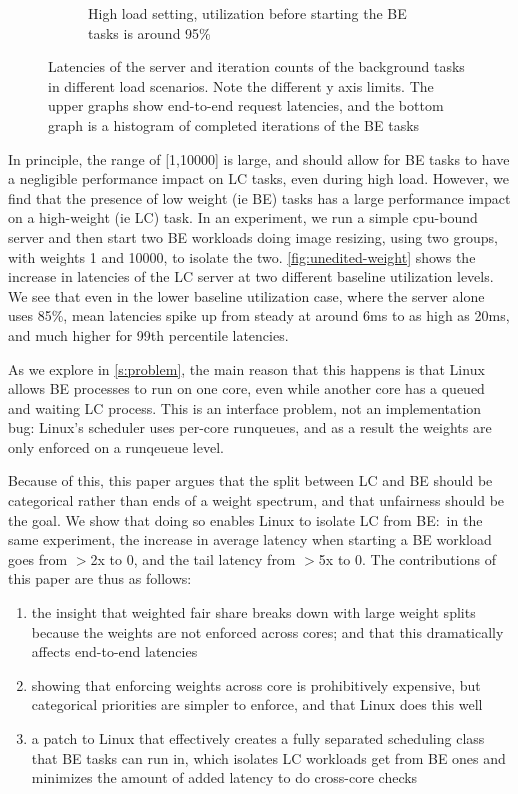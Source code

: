 \begin{figure}[t]
\begin{subfigure}[b]{0.49\columnwidth}
        \caption{High load setting, utilization before starting the BE tasks is
        around 95\%}\label{fig:unedited-weight-high-two}
    \end{subfigure}
    \vspace{4pt}
    \caption{Latencies of the server and iteration counts of the background
    tasks in different load scenarios. Note the different y axis limits. The
    upper graphs show end-to-end request latencies, and the bottom graph is a
    histogram of completed iterations of the BE tasks}\label{fig:unedited-weight}
\end{figure}

In principle, the range of [1,10000] is large, and should allow for BE tasks to
have a negligible performance impact on LC tasks, even during high load.
However, we find that the presence of low weight (ie BE) tasks has a large
performance impact on a high-weight (ie LC) task. In an experiment, we run a
simple cpu-bound server and then start two BE workloads doing image resizing,
using two \cgroups{} groups, with weights 1 and 10000, to isolate the two.
\autoref{fig:unedited-weight} shows the increase in latencies of the LC server
at two different baseline utilization levels. We see that even in the lower
baseline utilization case, where the server alone uses 85\%, mean latencies
spike up from steady at around 6ms to as high as 20ms, and much higher for 99th
percentile latencies.

As we explore in \autoref{s:problem}, the main reason that this happens is that
Linux allows BE processes to run on one core, even while another core has a
queued and waiting LC process. This is an interface problem, not an
implementation bug: Linux's scheduler uses per-core runqueues, and as a result
the weights are only enforced on a runqeueue level.

Because of this, this paper argues that the split between LC and BE should be
categorical rather than ends of a weight spectrum, and that unfairness should be
the goal. We show that doing so enables Linux to isolate LC from BE:\ in the
same experiment, the increase in average latency when starting a BE workload
goes from $>$2x to 0, and the tail latency from $>$5x to 0. The contributions of
this paper are thus as follows: 
\begin{enumerate}
    \item the insight that weighted fair share breaks down with large weight
    splits because the weights are not enforced across cores; and that this
    dramatically affects end-to-end latencies
    \item showing that enforcing weights across core is prohibitively expensive,
    but categorical priorities are simpler to enforce, and that Linux does this
    well
    \item a patch to Linux that effectively creates a fully separated scheduling
    class that BE tasks can run in, which isolates LC workloads get from BE ones
    and minimizes the amount of added latency to do cross-core checks
\end{enumerate}
